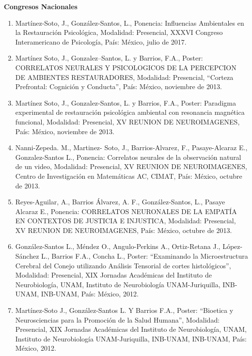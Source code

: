\textbf{Congresos Nacionales}

\hfill

\begin{enumerate}

\item Martínez-Soto, J., González-Santos, L., Ponencia: Influencias Ambientales en la Restauración Psicológica, Modalidad: 
Presencial, XXXVI Congreso Interamericano de Psicología, País: México, julio de 2017.


\item Martínez Soto, J., Gonzalez--Santos, L. y Barrios, F.A., Poster: CORRELATOS NEURALES Y PSICOLOGICOS DE 
LA PERCEPCION DE AMBIENTES RESTAURADORES, Modalidad: Presencial, “Corteza Prefrontal: Cognición y Conducta”, País: México, 
noviembre de 2013.

\item Martínez Soto, J., Gonzalez-Santos, L. y Barrios, F.A., Poster: Paradigma experimental de restauración psicológica 
ambiental con resonancia magnética funcional, Modalidad: Presencial, XV REUNION DE NEUROIMAGENES, País: México, noviembre de 2013.

\item Nanni-Zepeda. M., Martinez- Soto, J., Barrios-Alvarez, F., Pasaye-Alcaraz E., Gonzalez-Santos L., Ponencia: Correlatos 
neurales de la observación natural de un video, Modalidad: Presencial, XV REUNION DE NEUROIMAGENES, Centro de Investigación 
en Matemáticas AC, CIMAT, País: México, octubre de 2013.

\item Reyes-Aguilar, A., Barrios Álvarez, A. F., González-Santos, L., Pasaye Alcaraz E., Ponencia: CORRELATOS NEURONALES DE LA 
EMPATÍA EN CONTEXTOS DE JUSTICIA E INJUSTICA, Modalidad: Presencial, XV REUNION DE NEUROIMAGENES, País: México, octubre de 2013.

\item González-Santos L., Méndez O., Angulo-Perkins A., Ortiz-Retana J., López-Sánchez L., Barrios F.A., Concha L., Poster: 
“Examinando la Microestructura Cerebral del Conejo utilizando Análisis Tensorial de cortes histológicos”, Modalidad: 
Presencial, XIX Jornadas Académicas del Instituto de Neurobiología, UNAM, Instituto de Neurobiología UNAM-Juriquilla, 
INB-UNAM, INB-UNAM, País: México, 2012.

\item Martínez-Soto J., González-Santos L. Y Barrios F.A., Poster: “Bioetica y Neurosciencias para la Promoción de la Salud 
Humana”, Modalidad: Presencial, XIX Jornadas Académicas del Instituto de Neurobiología, UNAM, Instituto de Neurobiología 
UNAM-Juriquilla, INB-UNAM, INB-UNAM, País: México, 2012.


\end{enumerate}
